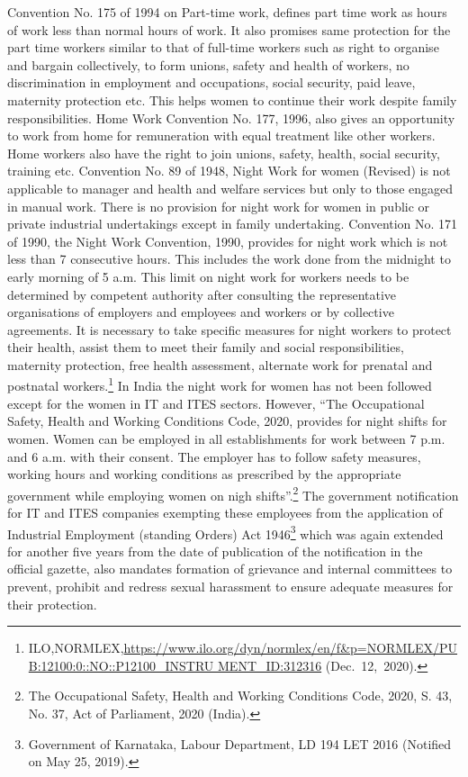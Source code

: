 \begin{multicols}{2}
\noi
Convention No. 175 of 1994 on Part-time work, defines part time work as hours of work less
than normal hours of work. It also promises same protection for the part time workers similar
to that of full-time workers such as right to organise and bargain collectively, to form unions,
safety and health of workers, no discrimination in employment and occupations, social
security, paid leave, maternity protection etc. This helps women to continue their work
despite family responsibilities. Home Work Convention No. 177, 1996, also gives an
opportunity to work from home for remuneration with equal treatment like other workers.
Home workers also have the right to join unions, safety, health, social security, training etc.
Convention No. 89 of 1948, Night Work for women (Revised) is not applicable to manager
and health and welfare services but only to those engaged in manual work. There is no
provision for night work for women in public or private industrial undertakings except in
family undertaking. Convention No. 171 of 1990, the Night Work Convention, 1990,
provides for night work which is not less than 7 consecutive hours. This includes the work
done from the midnight to early morning of 5 a.m. This limit on night work for workers
needs to be determined by competent authority after consulting the representative 
organisations of employers and employees and workers or by collective agreements. It is
necessary to take specific measures for night workers to protect their health, assist them to
meet their family and social responsibilities, maternity protection, free health assessment,
alternate work for prenatal and postnatal workers.\footnote{ILO,NORMLEX,\url{https://www.ilo.org/dyn/normlex/en/f\&p=NORMLEX/PUB:12100:0::NO::P12100_INSTRU
MENT_ID:312316} (Dec.~12,~2020).}  In India the night work for women has
not been followed except for the women in IT and ITES sectors. However, “The
Occupational Safety, Health and Working Conditions Code, 2020, provides for night shifts
for women. Women can be employed in all establishments for work between 7 p.m. and 6
a.m. with their consent. The employer has to follow safety measures, working hours and
working conditions as prescribed by the appropriate government while employing women on
nigh shifts”.\footnote{The Occupational Safety, Health and Working Conditions Code, 2020, S. 43, No. 37, Act of Parliament, 2020 (India).} The government notification for IT and ITES companies exempting these
employees from the application of Industrial Employment (standing Orders) Act 1946\footnote{Government of Karnataka, Labour Department, LD 194 LET 2016 (Notified on May 25, 2019).}
which was again extended for another five years from the date of publication of the
notification in the official gazette, also mandates formation of grievance and internal
committees to prevent, prohibit and redress sexual harassment to ensure adequate measures
for their protection. 


\end{multicols}
